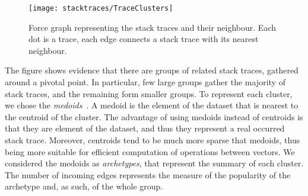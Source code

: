 \begin{figure}[ht]
\begin{center}
  \texttt{[image: stacktraces/TraceClusters]}
  \caption{Force graph representing the stack traces and their neighbour. Each dot is a trace, each edge connects a stack trace with its nearest neighbour.}
  \label{fig:eva-clusters}
\end{center}
\end{figure}

The figure shows evidence that there are groups of related stack traces, gathered around a pivotal point. In particular, few large groups gather the majority of stack traces, and the remaining form smaller groups. To represent each cluster, we chose the \emph{medoids}~\cite{Kauf1987}. A medoid is the element of the dataset that is nearest to the centroid of the cluster. The advantage of using medoids instead of centroids is that they are element of the dataset, and thus they represent a real occurred stack trace. Moreover, centroids tend to be much more sparse that medoids, thus being more suitable for efficient computation of operations between vectors. We considered the medoids as \emph{archetypes}, that represent the summary of each cluster. The number of incoming edges represents the measure of the popularity of the archetype and, as such, of the whole group.

